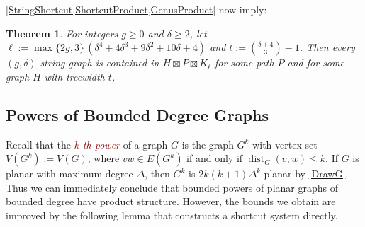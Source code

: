 \documentclass{patmorin}
\theoremstyle{plain}
\newtheorem{thm}{Theorem}
\theoremstyle{definition}
\newcommand{\defin}[1]{\textcolor{Maroon}{\emph{#1}}}
\newcommand{\note}[2]{\noindent{\color{red}[#1:~#2]}}
\DeclareMathOperator{\dist}{dist}
\DeclareMathOperator{\qn}{qn}
\DeclarePairedDelimiter{\ceil}{\lceil}{\rceil}
\renewcommand{\le}{\leqslant}
\renewcommand{\geq}{\geqslant}
\renewcommand{\leq}{\leqslant}
\begin{document}

\cref{StringShortcut,ShortcutProduct,GenusProduct} now imply:

\begin{thm}\label{StringProduct}
For integers $g\geq 0$ and $\delta\geq 2$, let $\ell:= \max\{2g,3\} \,(\delta^4 + 4 \delta^3 + 9 \delta^2 + 10 \delta + 4)$ and $t:= \binom{ \delta+4}{3}-1$.
Then  every $(g,\delta)$-string graph is contained in $H\boxtimes P \boxtimes K_{\ell}$ for some path $P$ and for some graph $H$ with treewidth $t$,
\end{thm}





\subsection{Powers of Bounded Degree Graphs}
\label{Powers}
\label{mid_example}

Recall that the \defin{$k$-th power} of a graph $G$ is the graph $G^k$ with vertex set $V(G^k):=V(G)$, where $vw\in E(G^k)$ if and only if $\dist_G(v,w)\leq k$. If $G$ is planar with maximum degree $\Delta$, then $G^k$ is $2k(k+1)\Delta^{k}$-planar by \cref{DrawG}.  Thus we can immediately conclude that bounded powers of planar graphs of bounded degree have product structure. However, the bounds we obtain are improved by the following lemma that constructs a shortcut system directly.
\end{document}
